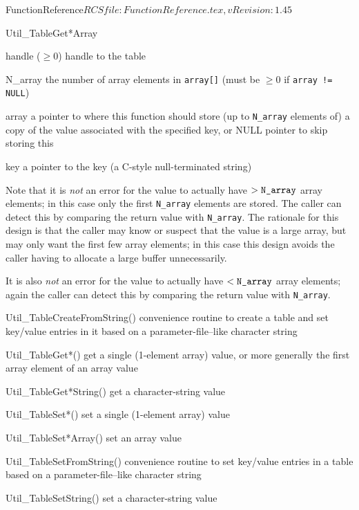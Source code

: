 \begin{cactuspart}{5}{FunctionReference}{$RCSfile: FunctionReference.tex,v $}{$Revision: 1.45 $}
\begin{FunctionDescription}{Util\_TableGet*Array}
\begin{Parameter}{handle ($\ge 0$)}
handle to the table
\end{Parameter}
\begin{Parameter}{N\_array}
the number of array elements in \verb|array[]|
(must be $\ge 0$ if \verb|array != NULL|)
\end{Parameter}
\begin{Parameter}{array}
a pointer to where this function should store (up to \verb|N_array|
elements of) a copy of the value associated with the specified key,
or NULL pointer to skip storing this
\end{Parameter}
\begin{Parameter}{key}
a pointer to the key (a C-style null-terminated string)
\end{Parameter}

\begin{Discussion}
Note that it is {\em not\/} an error for the value to actually have
$> \verb|N_array|$ array elements; in this case only the first \verb|N_array|
elements are stored.  The caller can detect this by comparing the
return value with \verb|N_array|.
The rationale for this design is that the caller may know or suspect
that the value is a large array, but may only want the first few array
elements; in this case this design avoids the caller having to allocate
a large buffer unnecessarily.

It is also {\em not\/} an error for the value to actually have
$< \verb|N_array|$ array elements; again the caller can detect this by
comparing the return value with \verb|N_array|.
\end{Discussion}

\begin{SeeAlso}{Util\_TableCreateFromString()}
convenience routine to create a table and set key/value entries
in it based on a parameter-file--like character string
\end{SeeAlso}
\begin{SeeAlso}{Util\_TableGet*()}
get a single (1-element array) value,
or more generally the first array element of an array value
\end{SeeAlso}
\begin{SeeAlso}{Util\_TableGet*String()}
get a character-string value
\end{SeeAlso}
\begin{SeeAlso}{Util\_TableSet*()}
set a single (1-element array) value
\end{SeeAlso}
\begin{SeeAlso}{Util\_TableSet*Array()}
set an array value
\end{SeeAlso}
\begin{SeeAlso}{Util\_TableSetFromString()}
convenience routine to set key/value entries in a table based on a
parameter-file--like character string
\end{SeeAlso}
\begin{SeeAlso}{Util\_TableSetString()}
set a character-string value
\end{SeeAlso}


\end{FunctionDescription}
\end{cactuspart}
